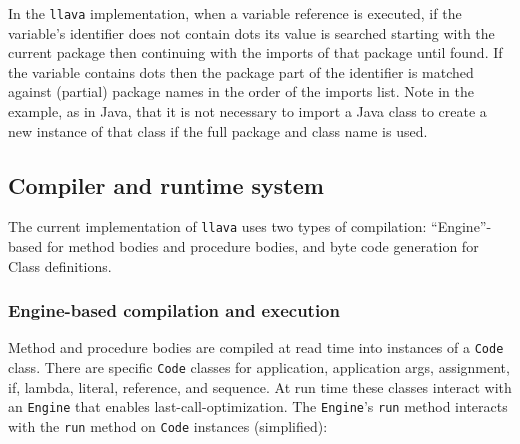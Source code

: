\documentclass{acm-final/sig-alternate-modified}
\begin{document}
In the {\tt llava} implementation, when a variable reference is
executed, if the variable's identifier does not contain dots its value
is searched starting with the current package then continuing with the
imports of that package until found.  If the variable contains dots
then the package part of the identifier is matched against (partial)
package names in the order of the imports list.  Note in the example,
as in Java, that it is not necessary to import a Java class to create
a new instance of that class if the full package and class name is
used.


\subsection{Compiler and runtime system}

The current implementation of {\tt llava} uses two types of
compilation: ``Engine''-based for method bodies and procedure bodies,
and byte code generation for Class definitions.

\subsubsection{Engine-based compilation and execution}

Method and procedure bodies are compiled at read time into instances
of a {\tt Code} class.  There are specific {\tt Code} classes for
application, application args, assignment, if, lambda, literal,
reference, and sequence.  At run time these classes interact with an
{\tt Engine} that enables last-call-optimization.  The {\tt Engine}'s
{\tt run} method interacts with the {\tt run} method on {\tt Code}
instances (simplified):
\end{document}
